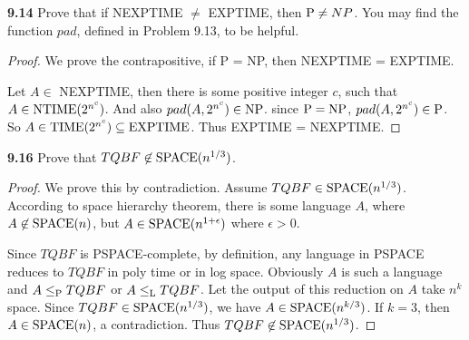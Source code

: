 \textbf{9.14} Prove that if NEXPTIME $\neq$ EXPTIME, then $\P \neq NP$. You may find the function $pad$, defined in Problem 9.13, to be helpful.
\begin{mdframed}
\begin{proof}
We prove the contrapositive, if P = NP, then NEXPTIME = EXPTIME.

Let $A \in$ NEXPTIME, then there is some positive integer $c$, such that $A \in \NTIME(2^{n^c})$. And also $pad(A, 2^{n^c}) \in \NP$. since $\P = \NP$, $pad(A, 2^{n^c}) \in \P$. So $A \in \TIME(2^{n^c}) \subseteq \EXPTIME$. Thus EXPTIME = NEXPTIME.
\end{proof}
\end{mdframed}

\textbf{9.16} Prove that $TQBF \not \in \SPACE(n^{1/3})$.
\begin{mdframed}
\begin{proof}
We prove this by contradiction. Assume $TQBF \in \SPACE(n^{1/3})$. According to space hierarchy theorem, there is some language $A$, where $A \not \in \SPACE(n)$, but $A \in \SPACE(n^{1+\epsilon})$ where $\epsilon > 0$.

Since $TQBF$ is PSPACE-complete, by definition, any language in PSPACE reduces to $TQBF$ in poly time or in log space. Obviously $A$ is such a language and $A \leq_\P TQBF$ or $A \leq_\L TQBF$. Let the output of this reduction on $A$ take $n^k$ space. Since $TQBF \in \SPACE(n^{1/3})$, we have $A \in \SPACE(n^{k/3})$. If $k = 3$, then $A \in \SPACE(n)$, a contradiction. Thus $TQBF \not \in \SPACE(n^{1/3})$. 
\end{proof}
\end{mdframed}

